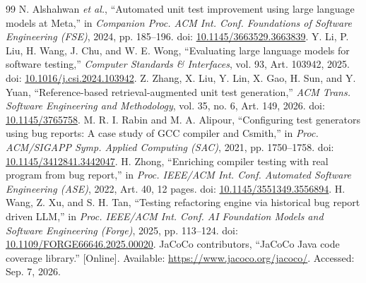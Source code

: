 \documentclass[acmsmall,screen,anonymous]{acmart}
\begin{document}
\begin{thebibliography}{99}
 N. Alshahwan \emph{et al.}, ``Automated unit test improvement using large language models at Meta,'' in \emph{Companion Proc. ACM Int. Conf. Foundations of Software Engineering (FSE)}, 2024, pp. 185--196. doi: \href{https://doi.org/10.1145/3663529.3663839}{10.1145/3663529.3663839}.
 Y. Li, P. Liu, H. Wang, J. Chu, and W. E. Wong, ``Evaluating large language models for software testing,'' \emph{Computer Standards \& Interfaces}, vol. 93, Art. 103942, 2025. doi: \href{https://doi.org/10.1016/j.csi.2024.103942}{10.1016/j.csi.2024.103942}.
 Z. Zhang, X. Liu, Y. Lin, X. Gao, H. Sun, and Y. Yuan, ``Reference-based retrieval-augmented unit test generation,'' \emph{ACM Trans. Software Engineering and Methodology}, vol. 35, no. 6, Art. 149, 2026. doi: \href{https://doi.org/10.1145/3765758}{10.1145/3765758}.
 M. R. I. Rabin and M. A. Alipour, ``Configuring test generators using bug reports: A case study of GCC compiler and Csmith,'' in \emph{Proc. ACM/SIGAPP Symp. Applied Computing (SAC)}, 2021, pp. 1750--1758. doi: \href{https://doi.org/10.1145/3412841.3442047}{10.1145/3412841.3442047}.
 H. Zhong, ``Enriching compiler testing with real program from bug report,'' in \emph{Proc. IEEE/ACM Int. Conf. Automated Software Engineering (ASE)}, 2022, Art. 40, 12 pages. doi: \href{https://doi.org/10.1145/3551349.3556894}{10.1145/3551349.3556894}.
 H. Wang, Z. Xu, and S. H. Tan, ``Testing refactoring engine via historical bug report driven LLM,'' in \emph{Proc. IEEE/ACM Int. Conf. AI Foundation Models and Software Engineering (Forge)}, 2025, pp. 113--124. doi: \href{https://doi.org/10.1109/FORGE66646.2025.00020}{10.1109/FORGE66646.2025.00020}.
 JaCoCo contributors, ``JaCoCo Java code coverage library.'' [Online]. Available: \url{https://www.jacoco.org/jacoco/}. Accessed: Sep. 7, 2026.


\end{thebibliography}
\end{document}

